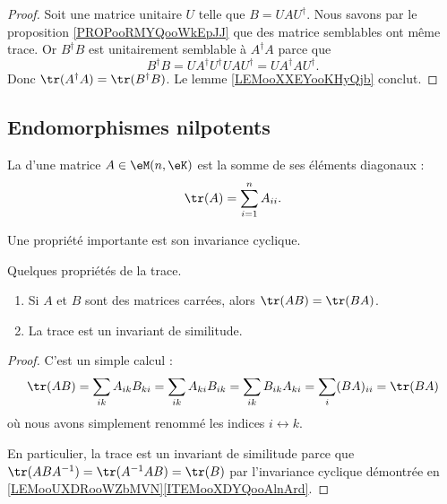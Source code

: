 \begin{proof}
	Soit une matrice unitaire \( U\) telle que \( B=UAU^{\dag}\). Nous savons par le proposition \ref{PROPooRMYQooWkEpJJ} que des matrice semblables ont même trace. Or \( B^{\dag}B\) est unitairement semblable à \( A^{\dag}A\) parce que
	\begin{equation}
		B^{\dag}B=UA^{\dag}U^{\dag}UAU^{\dag}=UA^{\dag}AU^{\dag}.
	\end{equation}
	Donc \( \tr(A^{\dag}A)=\tr(B^{\dag}B)\). Le lemme \ref{LEMooXXEYooKHyQjb} conclut.
\end{proof}

\subsection{Endomorphismes nilpotents}

\begin{definition}	\label{DEFooHDFBooSbMgZN}
	La  d'une matrice \( A\in \eM(n,\eK)\) est la somme de ses éléments diagonaux :
	\begin{equation}
		\tr(A)=\sum_{i=1}^nA_{ii}.
	\end{equation}
\end{definition}
Une propriété importante est son invariance cyclique.

\begin{lemma}   \label{LemhbZTay}
	Quelques propriétés de la trace.
	\begin{enumerate}
		\item		\label{ITEMooBRUGooFWQDss}
		      Si \( A\) et \( B\) sont des matrices carrées, alors \( \tr(AB)=\tr(BA)\).
		\item
		      La trace est un invariant de similitude.
	\end{enumerate}
\end{lemma}

\begin{proof}
	C'est un simple calcul :
	\begin{equation}
		\tr(AB)=\sum_{ik}A_{ik}B_{ki}
		=\sum_{ik}A_{ki}B_{ik}
		=\sum_{ik}B_{ik}A_{ki}
		=\sum_i(BA)_{ii}
		=\tr(BA)
	\end{equation}
	où nous avons simplement renommé les indices \( i\leftrightarrow k\).

	En particulier, la trace est un invariant de similitude parce que \( \tr(ABA^{-1})=\tr(A^{-1} AB)=\tr(B)\) par l'invariance cyclique démontrée en \ref{LEMooUXDRooWZbMVN}\ref{ITEMooXDYQooAlnArd}.
\end{proof}

